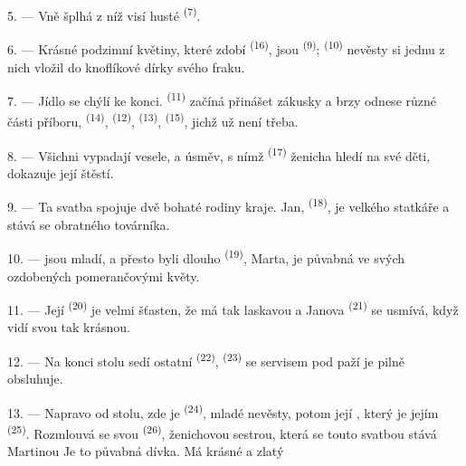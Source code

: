 5. --- Vně  šplhá  z níž visí husté 
\textsuperscript{(7)}.

6. --- Krásné podzimní květiny, které zdobí  \textsuperscript{(16)}, jsou
 \textsuperscript{(9)};  \textsuperscript{(10)}
nevěsty si jednu z nich vložil do knoflíkové dírky svého fraku.

7. --- Jídlo se chýlí ke konci.  \textsuperscript{(11)} začíná přinášet zákusky
a brzy odnese různé části příboru,  \textsuperscript{(14)},
 \textsuperscript{(12)},  \textsuperscript{(13)},
 \textsuperscript{(15)}, jichž už není třeba.

\VUsaut{3.0mm}

8. --- Všichni vypadají vesele, a úsměv, s nímž  \textsuperscript{(17)} ženicha
hledí na své děti, dokazuje její štěstí.

9. --- Ta svatba spojuje dvě bohaté rodiny kraje. Jan,  \textsuperscript{(18)},
je  velkého statkáře a stává se  obratného továrníka.

10. ---  jsou mladí, a přesto byli dlouho 
 \textsuperscript{(19)}, Marta, je půvabná ve svých  ozdobených pomerančovými květy.

11. --- Její  \textsuperscript{(20)} je velmi šťasten, že má tak laskavou
 a Janova  \textsuperscript{(21)} se usmívá, když vidí svou
 tak krásnou.

12. --- Na konci stolu sedí ostatní  \textsuperscript{(22)},
 
\textsuperscript{(23)} se servisem pod paží je pilně obsluhuje.

\VUsaut{3.0mm}

13. --- Napravo od stolu, zde je  \textsuperscript{(24)},
 mladé nevěsty, potom její , který je jejím
 \textsuperscript{(25)}. Rozmlouvá se svou 
\textsuperscript{(26)}, ženichovou sestrou, která se touto svatbou stává Martinou
 Je to půvabná dívka. Má krásné 
a zlatý 

